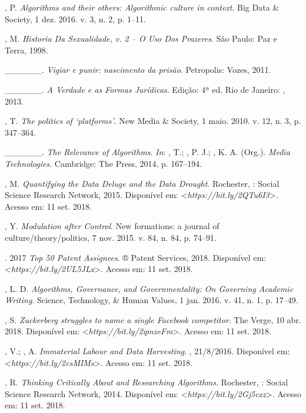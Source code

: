 \begin{Parskip}
, P. \emph{Algorithms and their others: Algorithmic culture in
context}. Big Data \& Society, 1 dez. 2016. v. 3, n. 2, p. 1--11.

, M. \emph{Historia Da Sexualidade, v. 2 -- O Uso Dos Prazeres}.
São Paulo: Paz e Terra, 1998.

\_\_\_\_\_\_. \emph{Vigiar e punir: nascimento da prisão}. Petropolis:
Vozes, 2011.

\_\_\_\_\_\_. \emph{A Verdade e as Formas Jurídicas}. Edição:
4ª ed. Rio de Janeiro: , 2013.

, T. \emph{The politics of `platforms'}. New Media \&
Society, 1 maio. 2010. v. 12, n. 3, p. 347--364.

\_\_\_\_\_\_. \emph{The Relevance of Algorithms}. \emph{In}:
, T.; , P. J.; , K. A. (Org.). \emph{Media
Technologies}. Cambridge: The  Press, 2014, p. 167--194.

, M. \emph{Quantifying the Data Deluge and the Data Drought}.
Rochester, : Social Science Research Network, 2015. Disponível em:
\textless{}\emph{https://bit.ly/2QTu6I3}\textgreater{}. Acesso em: 11 set. 2018.

, Y. \emph{Modulation after Control}. New formations: a journal of
culture/theory/politics, 7 nov. 2015. v. 84, n. 84, p. 74--91.

. 2017 \emph{Top 50  Patent Assignees}. ® Patent
Services, 2018. Disponível em: \textless{}\emph{https://bit.ly/2UL5JLx}\textgreater{}. Acesso em: 11 set. 2018.

, L. D. \emph{Algorithms, Governance, and Governmentality: On
Governing Academic Writing}. Science, Technology, \& Human
Values, 1 jan. 2016. v. 41, n. 1, p. 17--49.

, S. \emph{Zuckerberg struggles to name a single Facebook
competitor}. The Verge, 10 abr. 2018. Disponível em: \textless{}\emph{https://bit.ly/2qmzeFm}\textgreater{}. Acesso em: 11 set. 2018.

, V.; , A. \emph{Immaterial Labour and Data Harvesting}.
, 21/8/2016. Disponível em: \textless{}\emph{https://bit.ly/2csMIMs}\textgreater{}. Acesso em: 11 set. 2018.

, R. \emph{Thinking Critically About and Researching
Algorithms}. Rochester, : Social Science Research Network, 2014.
Disponível em: \textless{}\emph{https://bit.ly/2Gj5cxz}\textgreater{}. Acesso em: 11 set. 2018.


\end{Parskip}

